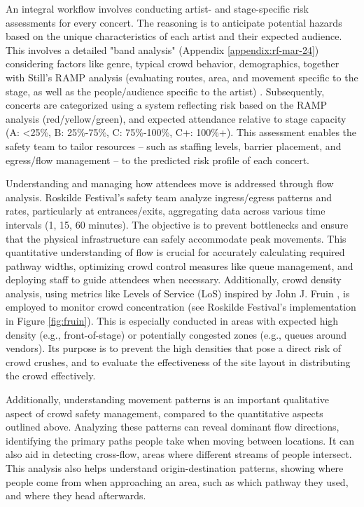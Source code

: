 An integral workflow involves conducting artist- and stage-specific risk assessments for every concert. The reasoning is to anticipate potential hazards based on the unique characteristics of each artist and their expected audience. This involves a detailed "band analysis" (Appendix \ref{appendix:rf-mar-24}) considering factors like genre, typical crowd behavior, demographics, together with Still's RAMP analysis (evaluating routes, area, and movement specific to the stage, as well as the people/audience specific to the artist) \cite{ramp}. Subsequently, concerts are categorized using a system reflecting risk based on the RAMP analysis (red/yellow/green), and expected attendance relative to stage capacity (A: <25\%, B: 25\%-75\%, C: 75\%-100\%, C+: 100\%+). This assessment enables the safety team to tailor resources -- such as staffing levels, barrier placement, and egress/flow management -- to the predicted risk profile of each concert.

Understanding and managing how attendees move is addressed through flow analysis. Roskilde Festival's safety team analyze ingress/egress patterns and rates, particularly at entrances/exits, aggregating data across various time intervals (1, 15, 60 minutes). The objective is to prevent bottlenecks and ensure that the physical infrastructure can safely accommodate peak movements. This quantitative understanding of flow is crucial for accurately calculating required pathway widths, optimizing crowd control measures like queue management, and deploying staff to guide attendees when necessary. Additionally, crowd density analysis, using metrics like Levels of Service (LoS) inspired by John J. Fruin \cite{fruin}, is employed to monitor crowd concentration (see Roskilde Festival's implementation in Figure \ref{fig:fruin}). This is especially conducted in areas with expected high density (e.g., front-of-stage) or potentially congested zones (e.g., queues around vendors). Its purpose is to prevent the high densities that pose a direct risk of crowd crushes, and to evaluate the effectiveness of the site layout in distributing the crowd effectively.

Additionally, understanding movement patterns is an important qualitative aspect of crowd safety management, compared to the quantitative aspects outlined above. Analyzing these patterns can reveal dominant flow directions, identifying the primary paths people take when moving between locations. It can also aid in detecting cross-flow, areas where different streams of people intersect. This analysis also helps understand origin-destination patterns, showing where people come from when approaching an area, such as which pathway they used, and where they head afterwards.

